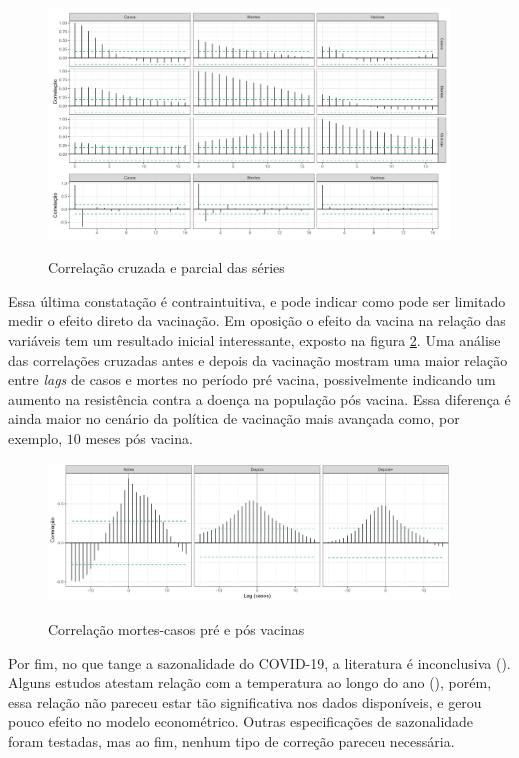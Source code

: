 \documentclass[
    article,
	12pt,				%
	oneside,			%
	a4paper,			%
	english,			%
	brazil,				%
	hyperref = {colorlinks, citecolor=c1d, linkcolor=c2d, urlcolor=c3d, colorlinks}
	]{abntex2}
\begin{document}
\begin{figure}[H]
    \centering
    \caption{Correlação cruzada e parcial das séries}
    \includegraphics[width = 0.95\textwidth]{Figures/stat_acf.png}
    \label{fig:acfall}
\end{figure}

Essa última constatação é contraintuitiva, e pode indicar como pode ser limitado medir o efeito direto da vacinação. Em oposição o efeito da vacina na relação das variáveis tem um resultado inicial interessante, exposto na figura \ref{fig:ccfad}. Uma análise das correlações cruzadas antes e depois da vacinação mostram uma maior relação entre \textit{lags} de casos e mortes no período pré vacina, possivelmente indicando um aumento na resistência contra a doença na população pós vacina. Essa diferença é ainda maior no cenário da política de vacinação mais avançada como, por exemplo, $10$ meses pós vacina.

\begin{figure}[H]
    \centering
    \caption{Correlação mortes-casos pré e pós vacinas}
    \includegraphics[width = 0.95\textwidth]{Figures/stat_ba.png}
    \label{fig:ccfad}
\end{figure}

Por fim, no que tange a sazonalidade do COVID-19, a literatura é inconclusiva (\cite{Byun2021}). Alguns estudos atestam relação com a temperatura ao longo do ano (\cite{Wiemken2023}), porém, essa relação não pareceu estar tão significativa nos dados disponíveis, e gerou pouco efeito no modelo econométrico. Outras especificações de sazonalidade foram testadas, mas ao fim, nenhum tipo de correção pareceu necessária.
\end{document}
